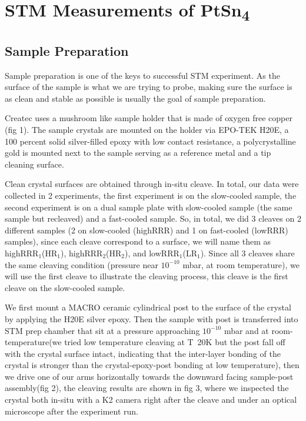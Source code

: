 \chapter{STM Measurements of PtSn\textsubscript{4}}
\section{Sample Preparation}

Sample preparation is one of the keys to successful STM experiment. As the surface of the sample is what we are trying to probe, making sure the surface is as clean and stable as possible is usually the goal of sample preparation. 
\par Createc uses a mushroom like sample holder that is made of oxygen free copper (fig 1). The sample crystals are mounted on the holder via EPO-TEK H20E, a 100 percent solid silver-filled epoxy with low contact resistance, a polycrystalline gold is mounted next to the sample serving as a reference metal and a tip cleaning surface. 
\par Clean crystal surfaces are obtained through in-situ cleave. In total, our data were collected in 2 experiments, the first experiment is on the slow-cooled sample, the second experiment is on a dual sample plate with slow-cooled sample (the same sample but recleaved) and a fast-cooled sample. So, in total, we did 3 cleaves on 2 different samples (2 on slow-cooled  (highRRR) and 1 on fast-cooled (lowRRR) samples), since each cleave correspond to a surface, we will name them as highRRR$_1$(HR$_1$), highRRR$_2$(HR$_2$), and lowRRR$_1$(LR$_1$). Since all 3 cleaves share the same cleaving condition (pressure near $10^{-10}$ mbar, at room temperature), we will use the first cleave to illustrate the cleaving process, this cleave is the first cleave on the slow-cooled sample. 
\par We first mount a MACRO ceramic cylindrical post to the surface of the crystal by applying the H20E silver epoxy. Then the sample with post is transferred into STM prep chamber that sit at a pressure approaching $10^{-10}$ mbar and at room-temperature(we tried low temperature cleaving at T~20K but the post fall off with the crystal surface intact, indicating that the inter-layer bonding of the crystal is stronger than the crystal-epoxy-post bonding at low temperature), then we drive one of our arms horizontally towards the downward facing sample-post assembly(fig 2), the cleaving results are shown in fig 3, where we inspected the crystal both in-situ with a K2 camera right after the cleave and under an optical microscope after the experiment run. 


